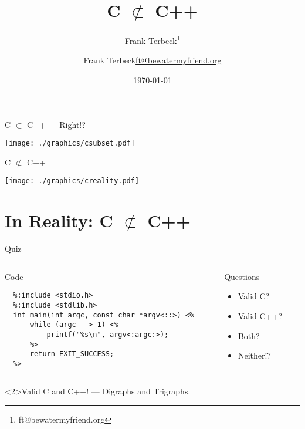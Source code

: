 \documentclass[presentation,aspectratio=169]{beamer}
\author{Frank Terbeck\thanks{ft@bewatermyfriend.org}}
\date{\today}
\title{C \(\not\subset\) C++}
\author{\texorpdfstring{Frank Terbeck\newline\tiny{\url{ft@bewatermyfriend.org}}}{Frank Terbeck}}
\begin{document}
\maketitle

\begin{frame}[label={sec:org2cd0672}]{C \(\subset\) C++ — Right!?}
\begin{center}
\texttt{[image: ./graphics/csubset.pdf]}
\end{center}
\end{frame}

\begin{frame}[label={sec:org2cd0672}]{C \(\not\subset\) C++}
\begin{center}
\texttt{[image: ./graphics/creality.pdf]}
\end{center}
\end{frame}

\section{In Reality: C \(\not\subset\) C++}
\label{sec:orgf0e5bbb}


\begin{frame}[fragile,label={sec:org23c4234}]{Quiz}
\begin{columns}
\begin{column}{0.68\columnwidth}
\begin{block}{Code}
\begin{verbatim}
  %:include <stdio.h>
  %:include <stdlib.h>
  int main(int argc, const char *argv<::>) <%
      while (argc-- > 1) <%
          printf("%s\n", argv<:argc:>);
      %>
      return EXIT_SUCCESS;
  %>
\end{verbatim}
\end{block}
\end{column}

\begin{column}{0.38\columnwidth}
\begin{block}{Questions}
\begin{itemize}
\item Valid C?
\item Valid C++?
\item Both?
\item Neither!?
\end{itemize}
\end{block}
\end{column}
\end{columns}

\begin{block}<2>{Valid C and C++! — Digraphs and Trigraphs.}
\end{block}
\end{frame}
\end{document}
